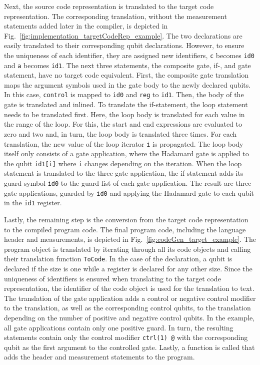 Next, the source code representation is translated to the target code representation. The corresponding translation, without the measurement statements added later in the compiler, is depicted in Fig.~\ref{fig:implementation_targetCodeRep_example}. The two declarations are easily translated to their corresponding qubit declarations. However, to ensure the uniqueness of each identifier, they are assigned new identifiers, \texttt{c} becomes \texttt{id0} and \texttt{a} becomes \texttt{id1}. The next three statements, the composite gate, if-, and gate statement, have no target code equivalent. First, the composite gate translation maps the argument symbols used in the gate body to the newly declared qubits. In this case, \texttt{control} is mapped to \texttt{id0} and \texttt{reg} to \texttt{id1}. Then, the body of the gate is translated and inlined. To translate the if-statement, the loop statement needs to be translated first. Here, the loop body is translated for each value in the range of the loop. For this, the start and end expressions are evaluated to zero and two and, in turn, the loop body is translated three times. For each translation, the new value of the loop iterator \texttt{i} is propagated. The loop body itself only consists of a gate application, where the Hadamard gate is applied to the qubit \texttt{id1[i]} where \texttt{i} changes depending on the iteration. When the loop statement is translated to the three gate application, the if-statement adds its guard symbol \texttt{id0} to the guard list of each gate application. The result are three gate applications, guarded by \texttt{id0} and applying the Hadamard gate to each qubit in the \texttt{id1} register.

Lastly, the remaining step is the conversion from the target code representation to the compiled program code. The final program code, including the language header and measurements, is depicted in Fig.~\ref{fig:codeGen_target_example}. The program object is translated by iterating through all its code objects and calling their translation function \texttt{ToCode}. In the case of the declaration, a qubit is declared if the size is one while a register is declared for any other size. Since the uniqueness of identifiers is ensured when translating to the target code representation, the identifier of the code object is used for the translation to text. The translation of the gate application adds a control or negative control modifier to the translation, as well as the corresponding control qubits, to the translation depending on the number of positive and negative control qubits. In the example, all gate applications contain only one positive guard. In turn, the resulting statements contain only the control modifier \texttt{ctrl(1) @} with the corresponding qubit as the first argument to the controlled gate. Lastly, a function is called that adds the header and measurement statements to the program.  

